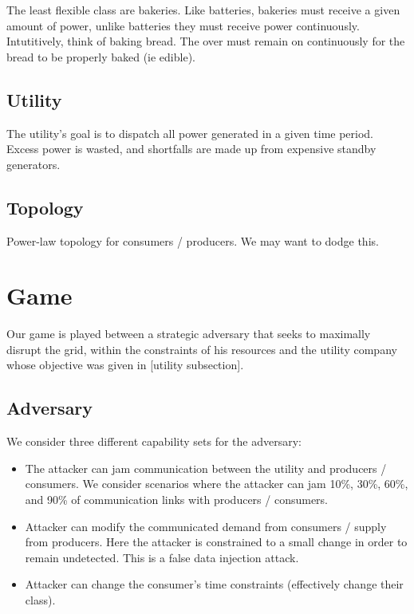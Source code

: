 \documentclass[conference]{IEEEtran}
\begin{document}
The least flexible class are bakeries.  Like batteries, bakeries must receive a given amount of power, unlike batteries they
must receive power continuously.  Intutitively, think of baking bread.  The over must remain on continuously for the bread
to be properly baked (ie edible).

\subsection{Utility}

The utility's goal is to dispatch all power generated in a given time period.  Excess power is wasted, and shortfalls are 
made up from expensive standby generators.  

\subsection{Topology}

Power-law topology for consumers / producers.  We may want to dodge this.

\section{Game}

Our game is played between a strategic adversary that seeks to maximally disrupt the grid, within the constraints of his
resources and the utility company whose objective was given in [utility subsection].  

\subsection{Adversary}

We consider three different capability sets for the adversary:

\begin{itemize}
\item The attacker can jam communication between the utility and producers / consumers.  We consider scenarios where the
attacker can jam 10\%, 30\%, 60\%, and 90\% of communication links with producers / consumers.
\item Attacker can modify the communicated demand from consumers / supply from producers.  Here the attacker is constrained
to a small change in order to remain undetected. This is a false data injection attack.
\item  Attacker can change the consumer's time constraints (effectively change their class).
\end{itemize}
\end{document}
